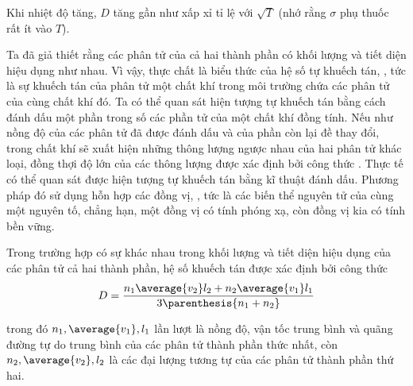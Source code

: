 \noindent
Khi nhiệt độ tăng, $D$ tăng gần như xấp xỉ tỉ lệ với $\sqrt{T}$ (nhớ rằng $\sigma$ phụ thuốc rất ít vào $T$).

Ta đã giả thiết rằng các phân tử của cả hai thành phần có khối lượng và tiết diện hiệu dụng như nhau. Vì vậy,  thực chất là biểu thức của hệ số tự khuếch tán, \ie, tức là sự khuếch tán của phân tử một chất khí trong môi trường chứa các phân tử của cùng chất khí đó. Ta có thể quan sát hiện tượng tự khuếch tán bằng cách đánh dấu một phần trong số các phần tử của một chất khí đồng tính. Nếu như nồng độ của các phân tử đã được đánh dấu và của phần còn lại đề thay đổi, trong chất khí sẽ xuất hiện những thông lượng ngược nhau của hai phân tử khác loại, đồng thợi độ lớn của các thông lượng được xác định bởi công thức . Thực tế có thể quan sát được hiện tượng tự khuếch tán bằng kĩ thuật đánh dấu. Phương pháp đó sử dụng hỗn hợp các đồng vị, \ie, tức là các biến thể nguyên tử của cùng một nguyên tố, chẳng hạn, một đồng vị có tính phóng xạ, còn đồng vị kia có tính bền vững.

Trong trường hợp có sự khác nhau trong khối lượng và tiết diện hiệu dụng của các phân tử cả hai thành phần, hệ số khuếch tán được xác định bởi công thức
\begin{equation*}
    D = \frac{n_1\average{v_2}l_2 + n_2\average{v_1}l_1}{3\parenthesis{n_1 + n_2}}
\end{equation*}

\noindent
trong đó $n_1, \average{v_1}, l_1$ lần lượt là nồng độ, vận tốc trung bình và quãng đường tự do trung bình của các phân tử thành phần thức nhất, còn $n_2, \average{v_2}, l_2$ là các đại lượng tương tự của các phân tử thành phần thứ hai.

